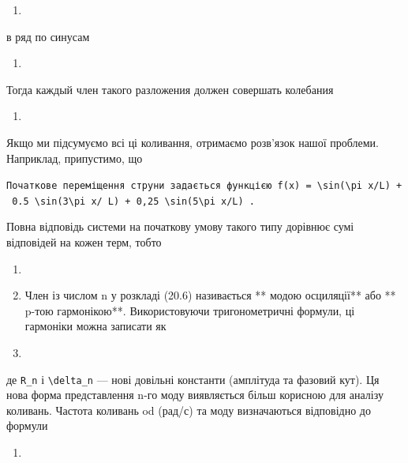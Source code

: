 \documentclass[
  ukrainian,
]{article}
\providecommand{\tightlist}{%
  \setlength{\itemsep}{0pt}\setlength{\parskip}{0pt}}
\begin{document}
\begin{enumerate}
\def\labelenumi{\arabic{enumi}.}
\setcounter{enumi}{14}
\tightlist
\item
\end{enumerate}

в ряд по синусам

\begin{enumerate}
\def\labelenumi{\arabic{enumi}.}
\setcounter{enumi}{15}
\tightlist
\item
\end{enumerate}

Тогда каждый член такого разложения должен совершать колебания

\begin{enumerate}
\def\labelenumi{\arabic{enumi}.}
\setcounter{enumi}{16}
\tightlist
\item
\end{enumerate}

Якщо ми підсумуємо всі ці коливання, отримаємо розв'язок нашої проблеми.
Наприклад, припустимо, що

\texttt{Початкове\ переміщення\ струни\ задається\ функцією\ \textquotesingle{}f(x)\ =\ \textbackslash{}sin(\textbackslash{}pi\ x/L)\ +\ 0.5\ \textbackslash{}sin(3\textbackslash{}pi\ x/\ L)\ +\ 0,25\ \textbackslash{}sin(5\textbackslash{}pi\ x/L)\textquotesingle{}\ .}

Повна відповідь системи на початкову умову такого типу дорівнює сумі
відповідей на кожен терм, тобто

\begin{enumerate}
\def\labelenumi{\arabic{enumi}.}
\setcounter{enumi}{17}
\item
\item
  Член із числом n у розкладі (20.6) називається ** модою осциляції**
  або ** p-тою гармонікою**. Використовуючи тригонометричні формули, ці
  гармоніки можна записати як
\item
\end{enumerate}

де \texttt{R\_n} і \texttt{\textbackslash{}delta\_n} --- нові довільні
константи (амплітуда та фазовий кут). Ця нова форма представлення n-го
моду виявляється більш корисною для аналізу коливань. Частота коливань
od (рад/с) та моду визначаються відповідно до формули

\begin{enumerate}
\def\labelenumi{\arabic{enumi}.}
\setcounter{enumi}{9}
\tightlist
\item
\end{enumerate}
\end{document}
